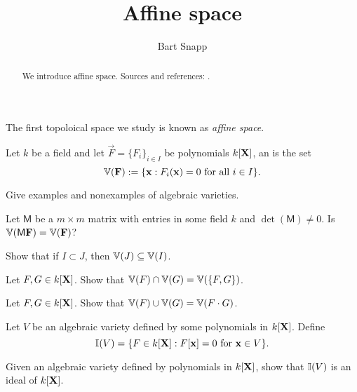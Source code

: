 \documentclass{ximera}
\author{Bart Snapp}
\title{Affine space}
\begin{document}
\begin{abstract}
  We introduce affine space. Sources and references:
  \cite{mR1995, SKKT2002}.
\end{abstract}
\maketitle

The first topoloical space we study is known as \textit{affine space}.



\begin{definition}
  Let $k$ be a field and let $\vec{F} = \{F_{i}\}_{i\in I}$ be polynomials
  $k[\mathbf X]$, an  is the set
  \[
  \mathbb V(\mathbf{F}) := \{\mathbf{x}: \text{$F_i(\mathbf{x}) = 0$ for all $i\in I$}\}.
  \]
\end{definition}


\begin{exercise}
  Give examples and nonexamples of algebraic varieties.
\end{exercise}





\begin{exercise}
  Let $\mathsf{M}$ be a $m\times m$ matrix with entries in some field
  $k$ and $\det(\mathsf{M}) \ne 0$. Is $\mathbb V( \mathsf{M} \mathbf{F}) =
  \mathbb V(\mathbf{F})$?
\end{exercise}


\begin{exercise}
  Show that if $I\subset J$, then $\mathbb V(J) \subseteq \mathbb V(I)$.
\end{exercise}

\begin{exercise}
  Let $F,G\in k[\mathbf X]$. Show that $\mathbb V(F) \cap\mathbb V(G) = \mathbb V(\{F,G\})$.
\end{exercise}


\begin{exercise}
  Let $F,G\in k[\mathbf X]$. Show that $\mathbb V(F) \cup\mathbb V(G) = \mathbb V(F\cdot G)$.
\end{exercise}





\begin{definition}
  Let $V$ be an algebraic variety defined by some polynomials in
  $k[\mathbf X]$. Define
  \[
  \mathbb I(V) = \{F\in k[\mathbf X]:F[\mathbf{x}] = 0 \text{ for } \mathbf{x} \in V\}.
  \]
\end{definition}

\begin{exercise}
  Given an algebraic variety defined by polynomials in $k[\mathbf X]$, show
  that $\mathbb I(V)$ is an ideal of $k[\mathbf X]$.
\end{exercise}
\end{document}
